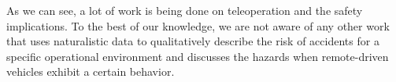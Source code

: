 As we can see, a lot of work is being done on teleoperation and the safety implications.
To the best of our knowledge, we are not aware of any other work that uses naturalistic data to qualitatively describe the risk of accidents for a specific operational environment and discusses the hazards when remote-driven vehicles exhibit a certain behavior.



